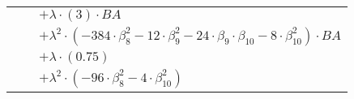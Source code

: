 \documentclass{article}
\begin{document}
\begin{table}[!hp]
\begin{center}
\begin{tabular}{rcl}
 & & $ + {\lambda}{\cdot}(3){\cdot}BA$ \\
 & & $ + {\lambda}^2{\cdot}(-384{\cdot}{\beta}_{8}^{2}-12{\cdot}{\beta}_{9}^{2}-24{\cdot}{\beta}_{9}{\cdot}{\beta}_{10}-8{\cdot}{\beta}_{10}^{2}){\cdot}BA$ \\
 & & $ + {\lambda}{\cdot}(0.75)$ \\
 & & $ + {\lambda}^2{\cdot}(-96{\cdot}{\beta}_{8}^{2}-4{\cdot}{\beta}_{10}^{2})$ \\
\end{tabular}
\end{center}
\end{table}
\end{document}
